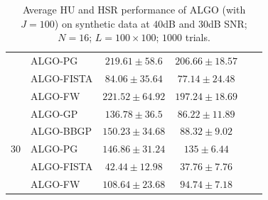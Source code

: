 \begin{table}[h]
\begin{adjustbox}{max width=\textwidth}
\begin{tabular}{|c|l|c|c|c|c|}
                    & ALGO-PG                    & $219.61   \pm 58.6$   & $206.66   \pm 18.57$ \tabularnewline
                    & ALGO-FISTA                 & $84.06    \pm 35.64$  & $77.14    \pm 24.48$ \tabularnewline
                    & ALGO-FW                    & $221.52   \pm 64.92$  & $197.24   \pm 18.69$ \tabularnewline \cline{1-4}
\multirow{5}{*}{30} & ALGO-GP                    & $136.78   \pm 36.5$   & $86.22    \pm 11.89$ \tabularnewline
                    & ALGO-BBGP                  & $150.23   \pm 34.68$  & $88.32    \pm 9.02$  \tabularnewline
                    & ALGO-PG                    & $146.86   \pm 31.24$  & $135      \pm 6.44$  \tabularnewline
                    & ALGO-FISTA                 & $42.44    \pm 12.98$  & $37.76    \pm 7.76$  \tabularnewline
                    & ALGO-FW                    & $108.64   \pm 23.68$  & $94.74    \pm 7.18$  \tabularnewline \cline{1-4}
\end{tabular}
\end{adjustbox}
\caption{Average HU and HSR performance of ALGO (with $J=100$) on synthetic
         data at $40$dB and $30$dB SNR; $N = 16$; $L = 100 \times 100$; $1000$
         trials.}
\label{table:results_full_MO16_SNR4030dB_J100}
\end{table}

\newpage

